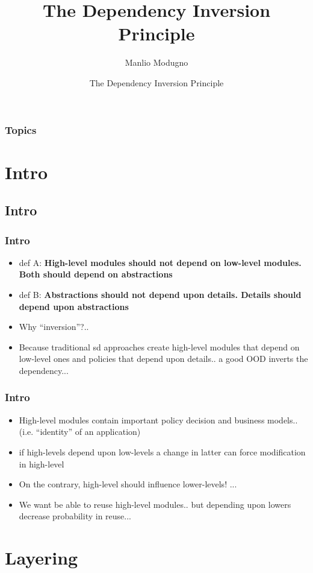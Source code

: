 \documentclass{beamer}
\title{The Dependency Inversion Principle}
\author{Manlio Modugno}
\institute[GMTechnologies]
\date[]{The Dependency Inversion Principle}
\begin{document}
\begin{frame}
  \titlepage
\end{frame}

\begin{frame}
  \frametitle{Topics}
  \tableofcontents
\end{frame}


\section{Intro}
\subsection{Intro}
\begin{frame}
  \frametitle{Intro}
  \begin{itemize}
	\item<+-> def A: \textbf{High-level modules should not depend on low-level modules. Both should depend on abstractions}
	\item<+-> def B: \textbf{Abstractions should not depend upon details. Details should depend upon abstractions}
	\item<+-> Why ``inversion''?..
	\item<+-> Because traditional sd approaches create high-level modules that depend on low-level ones and policies that depend upon details.. a good OOD inverts the dependency...
   \end{itemize}
\end{frame}

\begin{frame}
  \frametitle{Intro}
  \begin{itemize}
	\item<+-> High-level modules contain important policy decision and business models.. (i.e. ``identity'' of an application)
	\item<+-> if high-levels depend upon low-levels a change in latter can force modification in high-level
	\item<+-> On the contrary, high-level should influence lower-levels! ...
	\item<+-> We want be able to reuse high-level modules.. but depending upon lowers decrease probability in reuse...  
   \end{itemize}
\end{frame}

\section{Layering}
\end{document}
